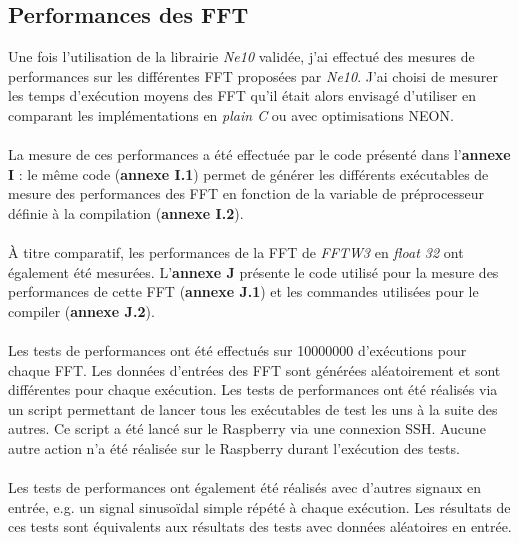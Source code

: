 \documentclass{article}
\begin{document}


    \subsection{Performances des FFT}
    \label{sec:fft_perfs}
    Une fois l'utilisation de la librairie \emph{Ne10} validée, j'ai effectué des mesures de performances sur les différentes FFT proposées par \emph{Ne10}. J'ai choisi de mesurer les temps d'exécution moyens des FFT qu'il était alors envisagé d'utiliser en comparant les implémentations en \emph{plain C} ou avec optimisations NEON.

    \paragraph{}
    La mesure de ces performances a été effectuée par le code présenté dans l'\textbf{annexe I} : le même code (\textbf{annexe I.1}) permet de générer les différents exécutables de mesure des performances des FFT en fonction de la variable de préprocesseur définie à la compilation (\textbf{annexe I.2}).

    \paragraph{}
    À titre comparatif, les performances de la FFT de \emph{FFTW3} en \emph{float 32} ont également été mesurées. L'\textbf{annexe J} présente le code utilisé pour la mesure des performances de cette FFT (\textbf{annexe J.1}) et les commandes utilisées pour le compiler (\textbf{annexe J.2}).

    \paragraph{}
    Les tests de performances ont été effectués sur \SI{10000000}{} d'exécutions pour chaque FFT. Les données d'entrées des FFT sont générées aléatoirement et sont différentes pour chaque exécution. Les tests de performances ont été réalisés via un script permettant de lancer tous les exécutables de test les uns à la suite des autres. Ce script a été lancé sur le Raspberry via une connexion SSH. Aucune autre action n'a été réalisée sur le Raspberry durant l'exécution des tests.

    \paragraph{}
    Les tests de performances ont également été réalisés avec d'autres signaux en entrée, e.g. un signal sinusoïdal simple répété à chaque exécution. Les résultats de ces tests sont équivalents aux résultats des tests avec données aléatoires en entrée.
    
\end{document}
